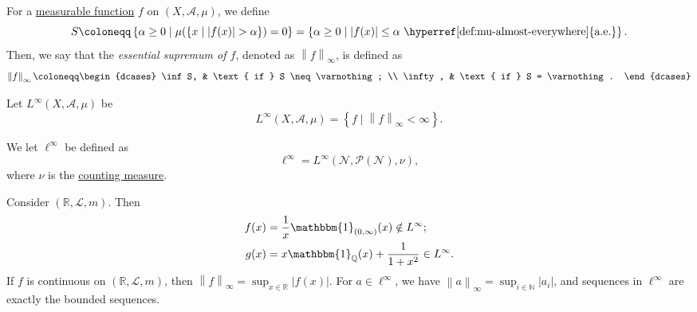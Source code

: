 \begin{definition}\label{def:essential-sumpremum}
	For a \hyperref[def:measurable-function]{measurable function} \(f\) on \((X, \mathcal{A} , \mu )\), we define
	\[
		S \coloneqq \left\{\alpha \geq 0\mid \mu (\{x\mid \left\vert f(x) \right\vert > \alpha \}) = 0\right\}
		= \left\{\alpha \geq 0\mid \left\vert f(x) \right\vert \leq \alpha \text{ \hyperref[def:mu-almost-everywhere]{a.e.}} \right\}.
	\]
	Then, we say that the \emph{essential supremum of \(f\)}, denoted as \(\left\lVert f\right\rVert _\infty \), is defined as
	\[
		\left\lVert f\right\rVert _\infty \coloneqq \begin{dcases}
			\inf S,  & \text{ if } S \neq \varnothing; \\
			\infty , & \text{ if } S = \varnothing.
		\end{dcases}
	\]
\end{definition}
\begin{definition}\label{def:L-infinity-space}
	Let \(L^{\infty} (X, \mathcal{A} , \mu )\) be
	\[
		L^{\infty} (X, \mathcal{A} , \mu ) = \left\{f\mid \left\lVert f\right\rVert _\infty < \infty \right\}.
	\]
\end{definition}

\begin{definition}\label{def:l-infinity-space}
	We let \(\ell ^{\infty} \) be defined as
	\[
		\ell ^{\infty} = L^{\infty} (\mathcal{N} , \mathcal{P} (\mathcal{N} ), \nu ),
	\]
	where \(\nu\) is the \hyperref[eg:counting-measure]{counting measure}.
\end{definition}

\begin{eg}
	Consider \((\mathbb{R} , \mathcal{L} , m)\). Then
	\[
		\begin{split}
			f(x) & = \frac{1}{x} \mathbbm{1}_{(0, \infty )} (x) \notin L^{\infty};         \\
			g(x) & = x \mathbbm{1}_{\mathbb{Q} }(x) + \frac{1}{1 + x^{2} } \in L^{\infty}.
		\end{split}
	\]
	If \(f\) is continuous on \((\mathbb{R} , \mathcal{L} , m)\), then \(\left\lVert f\right\rVert _\infty = \sup _{x\in \mathbb{R} }\left\vert f(x) \right\vert \).
	For \(a\in \ell ^{\infty} \), we have \(\left\lVert a\right\rVert _\infty = \sup _{i\in \mathbb{N} }\left\vert a_{i}  \right\vert\), and sequences in \(\ell ^{\infty} \)
	are exactly the bounded sequences.
\end{eg}

